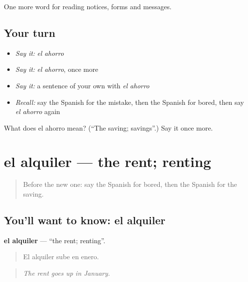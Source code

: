 \begin{grammarlens}[title={What you've built}]
One more word for reading notices, forms and messages.
\end{grammarlens}

\subsection*{Your turn}
\begin{itemize}
\raggedright
  \item \emph{Say it:} \emph{el ahorro}
  \item \emph{Say it:} \emph{el ahorro}, once more
  \item \emph{Say it:} a sentence of your own with \emph{el ahorro}
  \item \emph{Recall:} say the Spanish for the mistake, then the Spanish for bored, then say \emph{el ahorro} again
\end{itemize}

\begin{tcolorbox}[breakable,colback=teal!4,colframe=teal!35!black,title={Before you move on}]
What does el ahorro mean? (\textquotedblleft{}The saving; savings\textquotedblright{}.) Say it once more.
\end{tcolorbox}
\section[el alquiler]{el alquiler — the rent; renting}

\label{lesson:ES-C477-alquiler}



\begin{quote}
Before the new one: say the Spanish for bored, then the Spanish for the saving.
\end{quote}

\subsection*{You'll want to know: el alquiler}
\textbf{el alquiler} — \textquotedblleft{}the rent; renting\textquotedblright{}.

\begin{quote}
El alquiler sube en enero.
\end{quote}

\begin{quote}
\emph{The rent goes up in January.}
\end{quote}

